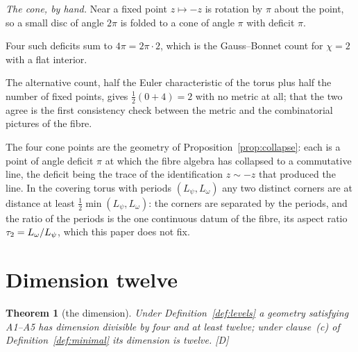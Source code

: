 \documentclass[11pt,a4paper]{article}
\theoremstyle{plain}
\newtheorem{theorem}{Theorem}[section]
\theoremstyle{definition}
\theoremstyle{remark}
\newcommand{\rigD}{[\textup{D}]}
\begin{document}
\emph{The cone, by hand.} Near a fixed point $z\mapsto-z$ is rotation by $\pi$ about the point, so a small disc of angle $2\pi$ is folded to a cone of angle $\pi$ with deficit $\pi$.

Four such deficits sum to $4\pi=2\pi\cdot2$, which is the Gauss--Bonnet count for $\chi=2$ with a flat interior.

The alternative count, half the Euler characteristic of the torus plus half the number of fixed points, gives $\tfrac12(0+4)=2$ with no metric at all; that the two agree is the first consistency check between the metric and the combinatorial pictures of the fibre.

The four cone points are the geometry of Proposition~\ref{prop:collapse}: each is a point of angle deficit $\pi$ at which the fibre algebra has collapsed to a commutative line, the deficit being the trace of the identification $z\sim-z$ that produced the line. In the covering torus with periods $(L_{\psi},L_{\omega})$ any two distinct corners are at distance at least $\tfrac12\min(L_{\psi},L_{\omega})$: the corners are separated by the periods, and the ratio of the periods is the one continuous datum of the fibre, its aspect ratio $\tau_2=L_{\omega}/L_{\psi}$, which this paper does not fix.

\section{Dimension twelve}\label{sec:dimension}

\begin{theorem}[the dimension]\label{thm:dim}
Under Definition~\ref{def:levels} a geometry satisfying A1--A5 has dimension divisible by four and at least twelve; under clause~(c) of Definition~\ref{def:minimal} its dimension is twelve. \rigD
\end{theorem}
\end{document}
